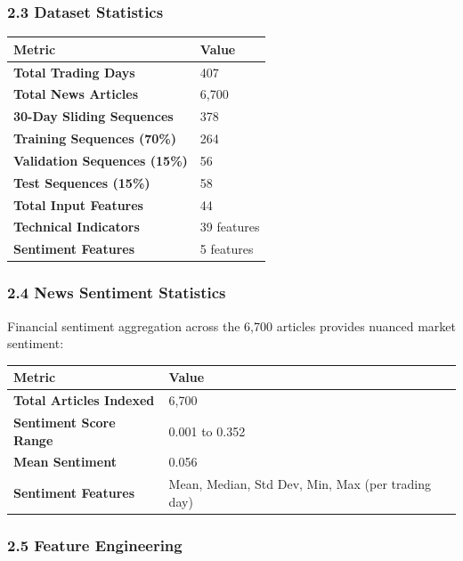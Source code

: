 \documentclass[
]{article}
\newcounter{none} %
\begin{document}
\subsubsection{2.3 Dataset Statistics}\label{23-dataset-statistics}

{\def\LTcaptype{none} %
\begin{longtable}[]{@{}ll@{}}
\toprule\noalign{}
Metric & Value \\
\midrule\noalign{}
\endhead
\bottomrule\noalign{}
\endlastfoot
\textbf{Total Trading Days} & 407 \\
\textbf{Total News Articles} & 6,700 \\
\textbf{30-Day Sliding Sequences} & 378 \\
\textbf{Training Sequences (70\%)} & 264 \\
\textbf{Validation Sequences (15\%)} & 56 \\
\textbf{Test Sequences (15\%)} & 58 \\
\textbf{Total Input Features} & 44 \\
\textbf{Technical Indicators} & 39 features \\
\textbf{Sentiment Features} & 5 features \\
\end{longtable}
}

\subsubsection{2.4 News Sentiment
Statistics}\label{24-news-sentiment-statistics}

Financial sentiment aggregation across the 6,700 articles provides
nuanced market sentiment:

{\def\LTcaptype{none} %
\begin{longtable}[]{@{}ll@{}}
\toprule\noalign{}
Metric & Value \\
\midrule\noalign{}
\endhead
\bottomrule\noalign{}
\endlastfoot
\textbf{Total Articles Indexed} & 6,700 \\
\textbf{Sentiment Score Range} & 0.001 to 0.352 \\
\textbf{Mean Sentiment} & 0.056 \\
\textbf{Sentiment Features} & Mean, Median, Std Dev, Min, Max (per
trading day) \\
\end{longtable}
}


\subsubsection{2.5 Feature Engineering}\label{25-feature-engineering}
\end{document}
